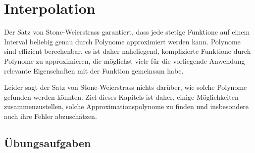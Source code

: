 %
%
%
\chapter{Interpolation\label{chapter:interpolation}}
\rhead{}
Der Satz von Stone-Weierstrass garantiert, dass jede stetige Funktione
auf einem Interval beliebig genau durch Polynome approximiert werden
kann.
Polynome sind effizient berechenbar, es ist daher naheliegend,
komplizierte Funktione durch Polynome zu approximieren, die möglichst
viele für die vorliegende Anwendung relevante Eigenschaften mit der
Funktion gemeinsam habe.

Leider sagt der Satz von Stone-Weierstrass nichts darüber, wie solche
Polynome gefunden werden könnten.
Ziel dieses Kapitels ist daher, einige Möglichkeiten zusammenzustellen,
solche Approximationspolynome zu finden und insbesondere auch ihre
Fehler abzuschätzen.







\section*{Übungsaufgaben}
\begin{uebungsaufgaben}
\end{uebungsaufgaben}
